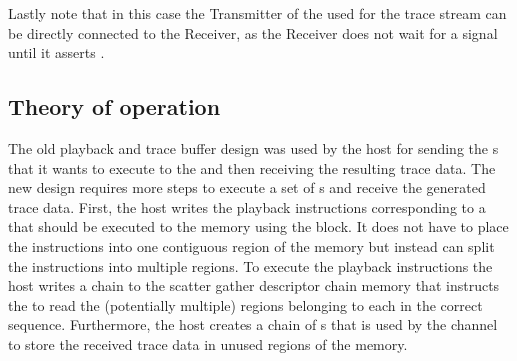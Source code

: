 Lastly note that in this case the \ValidNextStream{} Transmitter of the \pbexec{} used for the trace stream can be directly connected to the \SToMM{} \AXIStream{} Receiver, as the \SToMM{} \AXIStream{} Receiver does not wait for a \TVALID{} signal until it asserts \TREADY{}.




\subsection{Theory of operation}
The old playback and trace buffer design was used by the host for sending the \PlaybackProgram{}s that it wants to execute to the \FPGA{} and then receiving the resulting trace data.
The new design requires more steps to execute a set of \PlaybackProgram{}s and receive the generated trace data.
First, the host writes the playback instructions corresponding to a \PlaybackProgram{} that should be executed to the \DDR{} memory using the \FAXI{} block. It does not have to place the instructions into one contiguous region of the memory but instead can split the instructions into multiple regions.
To execute the playback instructions the host writes a \descriptor{} chain to the scatter gather descriptor chain memory that instructs the \AXIDMA{} to read the (potentially multiple) regions belonging to each \PlaybackProgram{} in the correct sequence.
Furthermore, the host creates a chain of \descriptor{}s that is used by the \SToMM{} channel to store the received trace data in unused regions of the \DDR{} memory.

